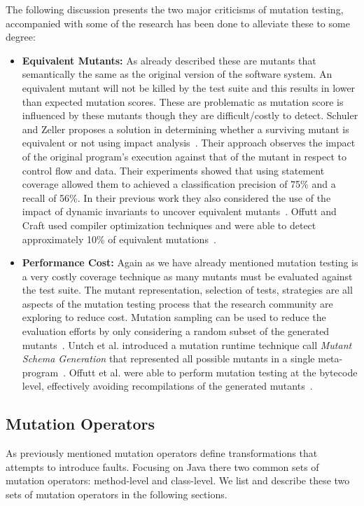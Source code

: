 The following discussion presents the two major criticisms of mutation testing, accompanied with some of the research has been done to alleviate these to some degree:

\begin{itemize}
  \item \textbf{Equivalent Mutants:} As already described these are mutants that semantically the same as the original version of the software system. An equivalent mutant will not be killed by the test suite and this results in lower than expected mutation scores. These are problematic as mutation score is influenced by these mutants though they are difficult/costly to detect. Schuler and Zeller proposes a solution in determining whether a surviving mutant is equivalent or not using impact analysis~\cite{SZ10}. Their approach observes the impact of the original program's execution against that of the mutant in respect to control flow and data. Their experiments showed that using statement coverage allowed them to achieved a classification precision of 75\% and a recall of 56\%. In their previous work they also considered the use of the impact of dynamic invariants to uncover equivalent mutants~\cite{SDZ09}. Offutt and Craft used compiler optimization techniques and were able to detect approximately 10\% of equivalent mutations~\cite{OC94}.
  \item \textbf{Performance Cost:} Again as we have already mentioned mutation testing is a very costly coverage technique as many mutants must be evaluated against the test suite. The mutant representation, selection of tests, strategies are all aspects of the mutation testing process that the research community are exploring to reduce cost. Mutation sampling can be used to reduce the evaluation efforts by only considering a random subset of the generated mutants~\cite{Bud80}. Untch et al. introduced a mutation runtime technique call \emph{Mutant Schema Generation} that represented all possible mutants in a single meta-program~\cite{UOH93}. Offutt et al. were able to perform mutation testing at the bytecode level, effectively avoiding recompilations of the generated mutants~\cite{OMK04}.
\end{itemize}


\subsection{Mutation Operators}
\label{subsec:background_mutation_operators}
As previously mentioned mutation operators define transformations that attempts to introduce faults. Focusing on Java there two common sets of mutation operators: method-level and class-level. We list and describe these two sets of mutation operators in the following sections.


